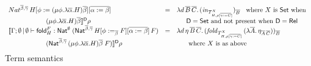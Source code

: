 \documentclass{lmcs}
\theoremstyle{plain}\newtheorem{satz}[thm]{Satz}
\newcommand{\fold}{\mathsf{fold}}
\newcommand{\set}{\mathsf{Set}}
\begin{document}
\begin{figure*}
{\begin{minipage}[t]{0.5\textwidth}
\[\begin{array}{lll}
Nat^{\ol{\beta},\ol{\gamma}} \, H[\phi := (\mu \phi.\lambda {\overline
    \alpha}.H){\overline \beta}][\ol{\alpha := \beta}] & = &
\lambda d\,\ol{B}\,
\ol{C}.\,(\mathit{in}_{{T}^X_{H,\rho[\ol{\gamma :=
        C}]}})_{\ol{B}} \;\;\mbox{ where } X \mbox{ is } \set \mbox{ when } \\ 
\hspace*{0.79in}(\mu \phi.\lambda {\overline \alpha}.H){\overline
  \beta} \rrbracket^{\mathsf{D}} \rho & & \hspace*{0.2in}  
\mathsf{D} = \set \mbox{ and not present when }
\mathsf{D} = \rel\\  
\llbracket \Gamma;\emptyset \,|\, \emptyset \vdash
  \fold^F_H : \Nat^\emptyset\;(\Nat^{\ol{\beta}, \ol{\gamma}}\,H[\phi
    :=_{\ol{\beta}} F][\ol{\alpha := \beta}]\,F) & = &  
\lambda d\,\eta\,\ol{B}\,\ol{C}.\,
(\mathit{fold}_{T^X_{H,\rho[\ol{\gamma := C}]}} \, (\lambda
\ol{A}.\,\eta_{\ol{A}\,\ol{C}}))_{\ol{B}}\\ 
\hspace*{0.79in}(\Nat^{{\ol{\beta},\ol{\gamma}} }\,(\mu
  \phi.\lambda \overline \alpha.H)\overline \beta\;F)
\rrbracket^{\mathsf{D}} \rho & & \hspace*{0.2in} \mbox{ where } X \mbox{ is as above
}\vspace*{-0.1in} 
\end{array}\]
\caption{Term semantics}\label{fig:term-sem} 
\end{minipage}}\vspace*{-0.05in}
\end{figure*}
\end{document}
